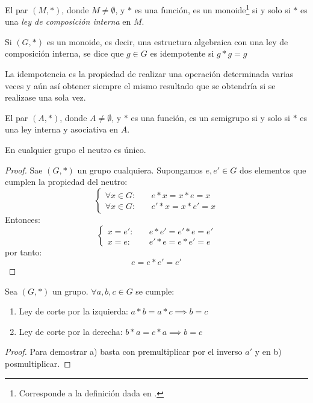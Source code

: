 \begin{fmd-definition}[Monoide]
	El par $(M, *)$, donde $M \ne \emptyset$, y $*$ es una función, es un monoide\footnote{Corresponde a la definición dada en \cite{rojoAlgebra8vaEd}.} si y solo si $*$ es una \textit{ley de composición interna} en $M$.
\end{fmd-definition}

\begin{definition}[Idempotencia] \label{def:idempotencia}
	Si $(G, *)$ es un monoide, es decir, una estructura algebraica con una ley de composición interna, se dice que $g \in G$ es idempotente si $g * g = g$
	
	La idempotencia es la propiedad de realizar una operación determinada varias veces y aún así obtener siempre el mismo resultado que se obtendría si se realizase una sola vez.
\end{definition}

\begin{fmd-definition}[Semigrupo]
	El par $(A, *)$, donde $A \ne \emptyset$, y $*$ es una función, es un semigrupo si y solo si $*$ es una ley interna y asociativa en $A$.
\end{fmd-definition}

\begin{proposition}
	En cualquier grupo el neutro es único.
\end{proposition}
\begin{proof}
	Sae $(G, *)$ un grupo cualquiera. Supongamos $e, e' \in G$ dos elementos que cumplen la propiedad del neutro:
	\[ \begin{cases}
		\forall x \in G:& \quad e*x = x*e = x\\
		\forall x \in G:& \quad e'*x = x*e' = x
	\end{cases} \]
	Entonces:
	\[ \begin{cases}
		x = e':& \quad e*e' = e'*e = e'\\
		x = e:& \quad e'*e = e*e' = e
	\end{cases} \]
	por tanto:
	\[ e = e*e' = e' \]
\end{proof}


\begin{fmd-proposition}
	Sea $(G, *)$ un grupo. $\forall a, b, c \in G$ se cumple:
	
	\begin{enumerate}[label=\alph*)]
		\item Ley de corte por la izquierda: $a * b = a * c \implies b = c$
		\item Ley de corte por la derecha: $b*a = c*a \implies b = c$
	\end{enumerate}
	\begin{proof}
		Para demostrar a) basta con premultiplicar por el inverso $a'$ y en b) posmultiplicar.
	\end{proof}
\end{fmd-proposition}

